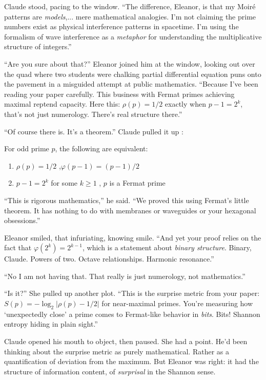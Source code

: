 Claude stood, pacing to the window. ``The difference, Eleanor, is that my Moiré patterns are \emph{models},... mere mathematical analogies. I'm not claiming the prime numbers exist as physical interference patterns in spacetime. I'm using the formalism of wave interference as a \emph{metaphor} for understanding the multiplicative structure of integers.''

``Are you sure about that?'' Eleanor joined him at the window, looking out over the quad where two students were chalking partial differential equation puns onto the pavement in a misguided attempt at public mathematics. ``Because I've been reading your paper carefully. This business with Fermat primes achieving maximal reptend capacity. Here this: $\rho(p) = 1/2$ exactly when $p-1 = 2^k$, that's not just numerology. There's real structure there.''

``Of course there is. It's a theorem.'' Claude pulled it up :

\begin{theorem}
For odd prime $p$, the following are equivalent:
\begin{enumerate}
\item $\rho(p) = 1/2$ ,\quad $\varphi(p-1) = (p-1)/2$
\item $p-1 = 2^k$ for some $k \geq 1$ ,\quad
 $p$ is a Fermat prime
\end{enumerate}
\end{theorem}

``This is rigorous mathematics,'' he said. ``We proved this using Fermat's little theorem. It has nothing to do with membranes or waveguides or your hexagonal obsessions.''

Eleanor smiled, that infuriating, knowing smile. ``And yet your proof relies on the fact that $\varphi(2^k) = 2^{k-1}$, which is a statement about \emph{binary structure}. Binary, Claude. Powers of two. Octave relationships. Harmonic resonance.''

``No I am not having that. That really is just numerology, not mathematics.''

``Is it?'' She pulled up another plot. ``This is the surprise metric from your paper: $S(p) = -\log_2|\rho(p) - 1/2|$ for near-maximal primes. You're measuring how `unexpectedly close' a prime comes to Fermat-like behavior in \emph{bits}. Bits! Shannon entropy hiding in plain sight.''

Claude opened his mouth to object, then paused. She had a point. He'd been thinking about the surprise metric as purely mathematical. Rather as a quantification of deviation from the maximum. But Eleanor was right: it had the structure of information content, of \textit{surprisal} in the Shannon sense.

